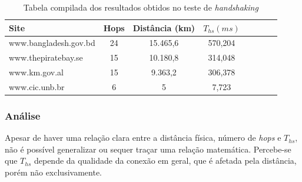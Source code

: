 \documentclass[12pt,a4paper]{report}
\begin{document}
\begin{table}[h]
	\center
	\begin{tabular}{l*{6}{c}r}
	Site						& Hops	& Distância (km)	& \(T_{hs} (ms)\)\\
	\hline
	www.bangladesh.gov.bd		& 24		& 15.465,6		& 570,204\\
	www.thepiratebay.se		& 15		& 10.180,8		& 314,048\\
	www.km.gov.al				& 15		& 9.363,2			& 306,378\\
	www.cic.unb.br				& 6		& 5				& 7,723\\
	\end{tabular}
	\caption{Tabela compilada dos resultados obtidos no teste de \textit{handshaking}}
	\label{tab:resultshandshaking}
\end{table}

\subsubsection*{Análise}

Apesar de haver uma relação clara entre a distância física, número de \textit{hops} e \(T_{hs}\), não é possível generalizar ou sequer traçar uma relação matemática. Percebe-se que \(T_{hs}\) depende da qualidade da conexão em geral, que é afetada pela distância, porém não exclusivamente.
\end{document}

